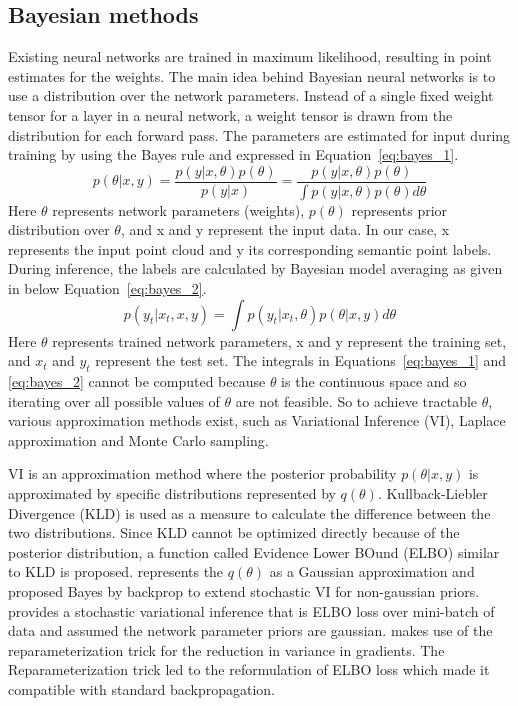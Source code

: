     \subsection{Bayesian methods}
    Existing neural networks are trained in maximum likelihood, resulting in point estimates for the weights.
    The main idea behind Bayesian neural networks is to use a distribution over the network parameters.
    Instead of a single fixed weight tensor for a layer in a neural network, a weight tensor is drawn from the distribution for each forward pass.
    The parameters are estimated for input during training by using the Bayes rule and expressed in Equation~\ref{eq:bayes_1}.
    \begin{equation}
        p(\theta|x, y) = \frac{p(y|x, \theta)p(\theta)}{p(y|x)} = \frac{p(y|x, \theta)p(\theta)}{\int p(y|x, \theta) p(\theta) d\theta} \label{eq:bayes_1}
    \end{equation}
    Here $\theta$ represents network parameters (weights), $p(\theta)$ represents prior distribution over $\theta$, and x and y represent the input data. In our case, x represents the input point cloud and y its corresponding semantic point labels.
    During inference, the labels are calculated by Bayesian model averaging as given in below Equation~\ref{eq:bayes_2}.
    \begin{equation}
        p(y_t|x_t, x, y) = \int p(y_t|x_t, \theta)p(\theta|x, y)d\theta \label{eq:bayes_2}  
    \end{equation}
    Here $\theta$ represents trained network parameters, x and y represent the training set, and $x_t$ and $y_t$ represent the test set.
    The integrals in Equations~\ref{eq:bayes_1} and \ref{eq:bayes_2} cannot be computed because $\theta$ is the continuous space and so iterating over all possible values of $\theta$ are not feasible.
    So to achieve tractable $\theta$, various approximation methods exist, such as Variational Inference (VI), Laplace approximation and Monte Carlo sampling.

    VI is an approximation method where the posterior probability $p(\theta|x, y)$ is approximated by specific distributions represented by $q(\theta)$.
    Kullback-Liebler Divergence (KLD) is used as a measure to calculate the difference between the two distributions. 
    Since KLD cannot be optimized directly because of the posterior distribution, a function called Evidence Lower BOund (ELBO) similar to KLD is proposed.
    \cite{Gaussian_Priors} represents the $q(\theta)$ as a Gaussian approximation and \cite{weight_uncertainty} proposed Bayes by backprop to extend stochastic VI for non-gaussian priors.
    \cite{Non_Gaussian_Priors} provides a stochastic variational inference that is ELBO loss over mini-batch of data and assumed the network parameter priors are gaussian.
    \cite{Flipout} makes use of the reparameterization trick for the reduction in variance in gradients. The Reparameterization trick led to the reformulation of ELBO loss which made it compatible with standard backpropagation.

